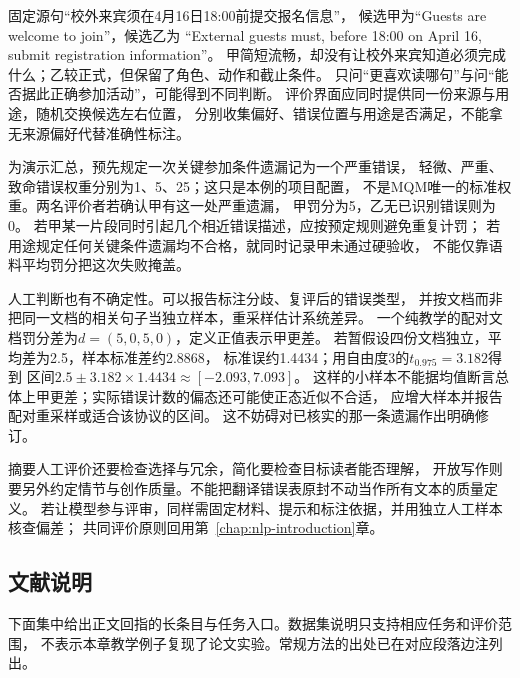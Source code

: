 固定源句“校外来宾须在4月16日18:00前提交报名信息”，
候选甲为“Guests are welcome to join”，候选乙为
“External guests must, before 18:00 on April 16, submit registration information”。
甲简短流畅，却没有让校外来宾知道必须完成什么；乙较正式，但保留了角色、动作和截止条件。
只问“更喜欢读哪句”与问“能否据此正确参加活动”，可能得到不同判断。
评价界面应同时提供同一份来源与用途，随机交换候选左右位置，
分别收集偏好、错误位置与用途是否满足，不能拿无来源偏好代替准确性标注。

为演示汇总，预先规定一次关键参加条件遗漏记为一个严重错误，
轻微、严重、致命错误权重分别为1、5、25；这只是本例的项目配置，
不是MQM唯一的标准权重。两名评价者若确认甲有这一处严重遗漏，
甲罚分为5，乙无已识别错误则为0。
若甲某一片段同时引起几个相近错误描述，应按预定规则避免重复计罚；
若用途规定任何关键条件遗漏均不合格，就同时记录甲未通过硬验收，
不能仅靠语料平均罚分把这次失败掩盖。

人工判断也有不确定性。可以报告标注分歧、复评后的错误类型，
并按文档而非把同一文档的相关句子当独立样本，重采样估计系统差异。
一个纯教学的配对文档罚分差为$d=(5,0,5,0)$，定义正值表示甲更差。
若暂假设四份文档独立，平均差为2.5，样本标准差约2.8868，
标准误约1.4434；用自由度3的$t_{0.975}=3.182$得到
区间$2.5\pm3.182\times1.4434\approx[-2.093,7.093]$。
这样的小样本不能据均值断言总体上甲更差；实际错误计数的偏态还可能使正态近似不合适，
应增大样本并报告配对重采样或适合该协议的区间。
这不妨碍对已核实的那一条遗漏作出明确修订。

摘要人工评价还要检查选择与冗余，简化要检查目标读者能否理解，
开放写作则要另外约定情节与创作质量。不能把翻译错误表原封不动当作所有文本的质量定义。
若让模型参与评审，同样需固定材料、提示和标注依据，并用独立人工样本核查偏差；
共同评价原则回用第~\ref{chap:nlp-introduction}章。

\subsection*{文献说明}
\label{sec:nlp-generation-literature}

下面集中给出正文回指的长条目与任务入口。数据集说明只支持相应任务和评价范围，
不表示本章教学例子复现了论文实验。常规方法的出处已在对应段落边注列出。

